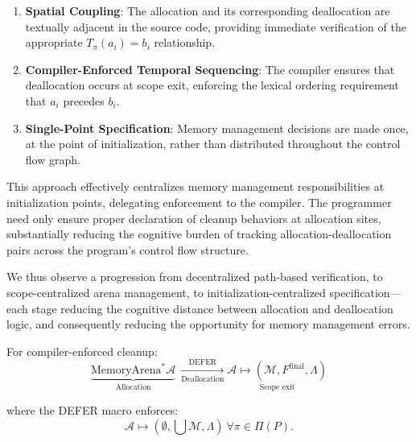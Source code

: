 \begin{enumerate}
	\item \textbf{Spatial Coupling}: The allocation and its corresponding deallocation are textually adjacent in the source code, providing immediate verification of the appropriate $T_{\pi}(a_i) = b_i$ relationship.

	\item \textbf{Compiler-Enforced Temporal Sequencing}: The compiler ensures that deallocation occurs at scope exit, enforcing the lexical ordering requirement that $a_i$ precedes $b_i$.

	\item \textbf{Single-Point Specification}: Memory management decisions are made once, at the point of initialization, rather than distributed throughout the control flow graph.
\end{enumerate}

\indent
\begin{raggedright}
	This approach effectively centralizes memory management responsibilities at initialization points, delegating enforcement to the compiler. The programmer need only ensure proper declaration of cleanup behaviors at allocation sites, substantially reducing the cognitive burden of tracking allocation-deallocation pairs across the program's control flow structure.
\end{raggedright}

We thus observe a progression from decentralized path-based verification, to scope-centralized arena management, to initialization-centralized specification—each stage reducing the cognitive distance between allocation and deallocation logic, and consequently reducing the opportunity for memory management errors.

For compiler-enforced cleanup:
\[
	\underset{\text{Allocation}}{\underbrace{\text{MemoryArena}^* \mathcal{A}}}
	\ \underset{\text{Deallocation}}{\xrightarrow{\text{DEFER}}}
	\underset{\text{Scope exit}}{\mathcal{A} \mapsto (\mathcal{M}, F^{\text{final}}, \Lambda)}
\]

where the DEFER macro enforces:
\[
	\mathcal{A} \mapsto (\emptyset, \bigcup \mathcal{M}, \Lambda)\ \forall \pi \in \Pi(P).
\]
\newpage
